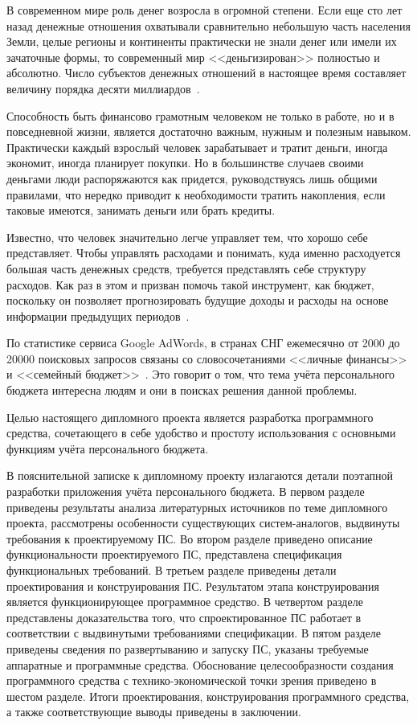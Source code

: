 \label{sec:introduction}

В современном мире роль денег возросла в огромной степени.
Если еще сто лет назад денежные отношения охватывали сравнительно небольшую часть населения Земли, целые регионы и континенты практически не знали денег или имели их зачаточные формы, то современный мир <<деньгизирован>> полностью и абсолютно.
Число субъектов денежных отношений в настоящее время составляет величину порядка десяти миллиардов~\cite{money_sorgin}.

Способность быть финансово грамотным человеком не только в работе, но и в повседневной жизни, является достаточно важным, нужным и полезным навыком.
Практически каждый взрослый человек зарабатывает и тратит деньги, иногда экономит, иногда планирует покупки.
Но в большинстве случаев своими деньгами люди распоряжаются как придется, руководствуясь лишь общими правилами, что нередко приводит к необходимости тратить накопления, если таковые имеются, занимать деньги или брать кредиты.

Известно, что человек значительно легче управляет тем, что хорошо себе представляет.
Чтобы управлять расходами и понимать, куда именно расходуется большая часть денежных средств, требуется представлять себе структуру расходов.
Как раз в этом и призван помочь такой инструмент, как бюджет, поскольку он позволяет прогнозировать будущие доходы и расходы на основе информации предыдущих периодов~\cite{money_under_control}.

По статистике сервиса Google AdWords, в странах СНГ ежемесячно от 2000 до 20000 поисковых запросов связаны со словосочетаниями <<личные финансы>> и <<семейный бюджет>>~\cite{google_adwords}.
Это говорит о том, что тема учёта персонального бюджета интересна людям и они в поисках решения данной проблемы.

Целью настоящего дипломного проекта является разработка программного средства, сочетающего в себе удобство и простоту использования с основными функциям учёта персонального бюджета.

В пояснительной записке к дипломному проекту излагаются детали поэтапной разработки приложения учёта персонального бюджета.
В первом разделе приведены результаты анализа литературных источников по теме дипломного проекта, рассмотрены особенности существующих систем-аналогов, выдвинуты требования к проектируемому ПС.
Во втором разделе приведено описание функциональности проектируемого ПС, представлена спецификация функциональных требований.
В третьем разделе приведены детали проектирования и конструирования ПС.
Результатом этапа конструирования является функционирующее программное средство.
В четвертом разделе представлены доказательства того, что спроектированное ПС работает в соответствии с выдвинутыми требованиями спецификации.
В пятом разделе приведены сведения по развертыванию и запуску ПС, указаны требуемые аппаратные и программные средства.
Обоснование целесообразности создания программного средства с технико-экономической точки зрения приведено в шестом разделе.
Итоги проектирования, конструирования программного средства, а также соответствующие выводы приведены в заключении.

